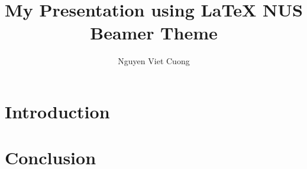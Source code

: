 \documentclass{beamer}
\begin{document}
\title{My Presentation using LaTeX NUS Beamer Theme}
\author{Nguyen Viet Cuong}
\date{}

\frame{\titlepage}



\section{Introduction}
\frame{}

\section{Conclusion}
\frame{}
\end{document}
